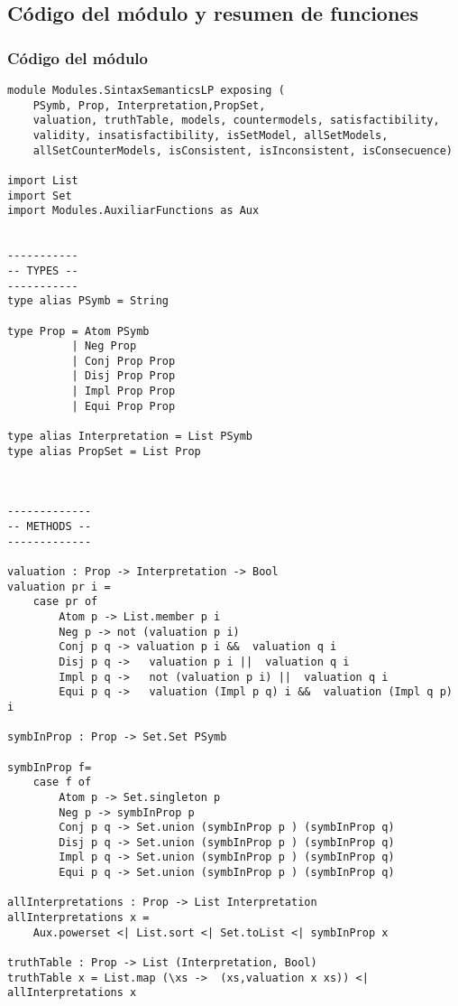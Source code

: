 \documentclass[a4paper]{report}
\begin{document}
\subsection{Código del módulo y resumen de funciones}
\subsubsection{Código del módulo}
\begin{lstlisting}[caption={Módulo SintaxSemanticsLP}]
module Modules.SintaxSemanticsLP exposing (
    PSymb, Prop, Interpretation,PropSet,
    valuation, truthTable, models, countermodels, satisfactibility, 
    validity, insatisfactibility, isSetModel, allSetModels, 
    allSetCounterModels, isConsistent, isInconsistent, isConsecuence)

import List
import Set
import Modules.AuxiliarFunctions as Aux 


-----------
-- TYPES --
-----------
type alias PSymb = String 

type Prop = Atom PSymb
          | Neg Prop
          | Conj Prop Prop
          | Disj Prop Prop
          | Impl Prop Prop
          | Equi Prop Prop

type alias Interpretation = List PSymb
type alias PropSet = List Prop



-------------
-- METHODS --
-------------

valuation : Prop -> Interpretation -> Bool
valuation pr i =
    case pr of
        Atom p -> List.member p i
        Neg p -> not (valuation p i)
        Conj p q -> valuation p i &&  valuation q i
        Disj p q ->   valuation p i ||  valuation q i
        Impl p q ->   not (valuation p i) ||  valuation q i
        Equi p q ->   valuation (Impl p q) i &&  valuation (Impl q p) i

symbInProp : Prop -> Set.Set PSymb

symbInProp f=
    case f of
        Atom p -> Set.singleton p
        Neg p -> symbInProp p
        Conj p q -> Set.union (symbInProp p ) (symbInProp q)
        Disj p q -> Set.union (symbInProp p ) (symbInProp q)
        Impl p q -> Set.union (symbInProp p ) (symbInProp q)
        Equi p q -> Set.union (symbInProp p ) (symbInProp q)

allInterpretations : Prop -> List Interpretation
allInterpretations x =  
    Aux.powerset <| List.sort <| Set.toList <| symbInProp x

truthTable : Prop -> List (Interpretation, Bool)
truthTable x = List.map (\xs ->  (xs,valuation x xs)) <| allInterpretations x


\end{lstlisting}
\end{document}
